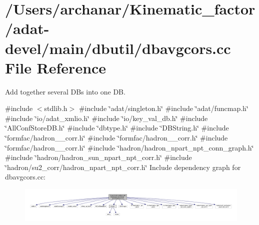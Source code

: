 \hypertarget{adat-devel_2main_2dbutil_2dbavgcors_8cc}{}\section{/\+Users/archanar/\+Kinematic\+\_\+factor/adat-\/devel/main/dbutil/dbavgcors.cc File Reference}
\label{adat-devel_2main_2dbutil_2dbavgcors_8cc}


Add together several DB\textquotesingle{}s into one DB.  


{\ttfamily \#include $<$stdlib.\+h$>$}\newline
{\ttfamily \#include \char`\"{}adat/singleton.\+h\char`\"{}}\newline
{\ttfamily \#include \char`\"{}adat/funcmap.\+h\char`\"{}}\newline
{\ttfamily \#include \char`\"{}io/adat\+\_\+xmlio.\+h\char`\"{}}\newline
{\ttfamily \#include \char`\"{}io/key\+\_\+val\+\_\+db.\+h\char`\"{}}\newline
{\ttfamily \#include \char`\"{}All\+Conf\+Store\+D\+B.\+h\char`\"{}}\newline
{\ttfamily \#include \char`\"{}dbtype.\+h\char`\"{}}\newline
{\ttfamily \#include \char`\"{}D\+B\+String.\+h\char`\"{}}\newline
{\ttfamily \#include \char`\"{}formfac/hadron\+\_\+1pt\+\_\+corr.\+h\char`\"{}}\newline
{\ttfamily \#include \char`\"{}formfac/hadron\+\_\+2pt\+\_\+corr.\+h\char`\"{}}\newline
{\ttfamily \#include \char`\"{}formfac/hadron\+\_\+3pt\+\_\+corr.\+h\char`\"{}}\newline
{\ttfamily \#include \char`\"{}hadron/hadron\+\_\+npart\+\_\+npt\+\_\+conn\+\_\+graph.\+h\char`\"{}}\newline
{\ttfamily \#include \char`\"{}hadron/hadron\+\_\+sun\+\_\+npart\+\_\+npt\+\_\+corr.\+h\char`\"{}}\newline
{\ttfamily \#include \char`\"{}hadron/su2\+\_\+corr/hadron\+\_\+npart\+\_\+npt\+\_\+corr.\+h\char`\"{}}\newline
Include dependency graph for dbavgcors.\+cc\+:
\nopagebreak
\begin{figure}[H]
\begin{center}
\leavevmode
\includegraphics[width=350pt]{d1/d13/adat-devel_2main_2dbutil_2dbavgcors_8cc__incl}
\end{center}
\end{figure}
